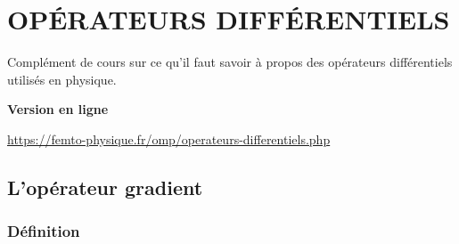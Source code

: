 \setchapterpreamble[u]{\margintoc} 
\chapter{OPÉRATEURS DIFFÉRENTIELS}

Complément de cours sur ce qu'il faut savoir à propos des opérateurs différentiels utilisés en physique.

\begin{center}
\textbf{Version en ligne}

\url{https://femto-physique.fr/omp/operateurs-differentiels.php}
\end{center}


\section{L'opérateur gradient}
\subsection{Définition}

